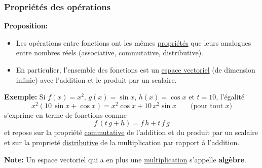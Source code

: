 \documentclass[10pt]{beamer}
\newcommand{\bitem}{\item[$\bullet$]}
\begin{document}
\begin{frame}[plain]
\frametitle{\bf Propri\'et\'es des op\'erations}
\medskip 

{\bf Proposition:}
\begin{itemize}
\bitem
Les op\'erations entre fonctions ont les m\^emes \underline{propri\'et\'es} 
que leurs analogues entre nombres r\'eels {\small (associative, commutative, 
distributive)}. 

\bitem
En particulier, l'ensemble des fonctions est un \underline{espace vectoriel} 
(de dimension infinie) avec l'addition et le produit par un scalaire. 
\end{itemize}
\vspace*{2mm}

\pause
{\small 
{\bf Exemple:}
Si $f(x)=x^2$, $g(x)=\sin x$, $h(x)=\cos x$ et $t=10$, l'\'egalit\'e
$$
x^2(10\,\sin x+\cos x) = x^2\cos x+10\,x^2\sin x \qquad\mbox{(pour tout $x$)}
$$
s'exprime en terme de fonctions comme 
$$
f\,(t\,g+h) = f\,h + t\,f\,g
$$ 
et repose sur la propri\'et\'e \underline{commutative} de l'addition et du 
produit par un scalaire et sur la propriet\'e \underline{distributive} 
de la multiplication par rapport \`a l'addition.}
\vspace*{3mm}

\pause
{\bf Note:} Un espace vectoriel qui a en plus une \underline{multiplication} 
s'appelle {\bf alg\`ebre}.

\end{frame}

\end{document}
